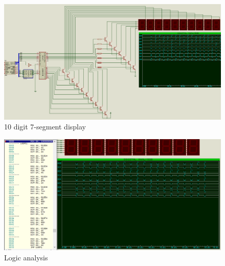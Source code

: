 \documentclass[11pt]{article}
\begin{document}
\begin{figure}
	\centering
	\includegraphics[width=21cm]{Tasarım.png}
	\caption{10 digit 7-segment display}
	\label{Tasarım2}
\end{figure}
\begin{figure}
	\centering
	\includegraphics[width=21cm]{Graph.png}
	\caption{Logic analysis}
	\label{Analiz}
\end{figure}
\end{document}
